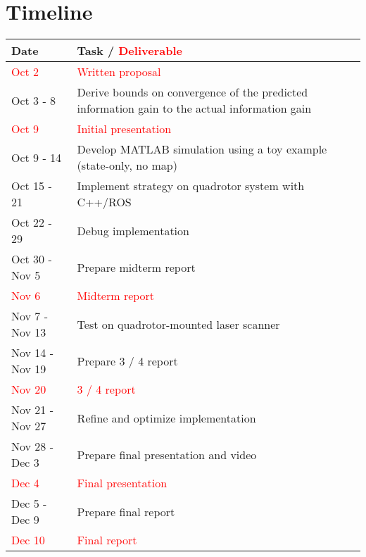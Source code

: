 \section{Timeline}

\begin{table}[!ht]
  \centering
  \begin{tabular}{|l|p{13.5 cm} | } \hline
    \textbf{Date} & \textbf{Task / \textcolor{red}{Deliverable}} \\ \hline
            \textcolor{red}{Oct 2} & \textcolor{red}{Written proposal} \\ \hline
            Oct 3 - 8 & Derive bounds on convergence of the predicted information gain to the actual information gain \\ \hline
            \textcolor{red}{Oct 9} & \textcolor{red}{Initial presentation} \\ \hline
            Oct 9 - 14 & Develop MATLAB simulation using a toy example (state-only, no map) \\ \hline
            Oct 15 - 21 & Implement strategy on quadrotor system with C++/ROS \\ \hline
            Oct 22 - 29 & Debug implementation \\ \hline
            Oct 30 - Nov 5 & Prepare midterm report \\ \hline
            \textcolor{red}{Nov 6} & \textcolor{red}{Midterm report} \\ \hline
            Nov 7 - Nov 13 & Test on quadrotor-mounted laser scanner \\ \hline
            Nov 14 - Nov 19 & Prepare 3 / 4 report \\ \hline
           \textcolor{red}{Nov 20} & \textcolor{red}{3 / 4 report} \\ \hline
             Nov 21 - Nov 27 & Refine and optimize implementation \\ \hline
            Nov 28 - Dec 3 & Prepare final presentation and video \\ \hline
            \textcolor{red}{Dec 4} & \textcolor{red}{Final presentation} \\ \hline
            Dec 5 - Dec 9 & Prepare final report \\ \hline
           \textcolor{red}{Dec 10} & \textcolor{red}{Final report} \\ \hline
  \end{tabular}
  \label{tab:timeline}
\end{table}

